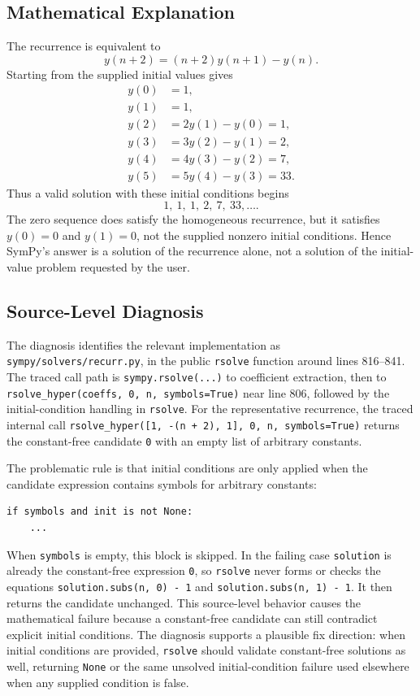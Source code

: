 \documentclass[11pt]{article}
\begin{document}
\subsection{Mathematical Explanation}

The recurrence is equivalent to
\[
    y(n+2) = (n+2)y(n+1) - y(n).
\]
Starting from the supplied initial values gives
\[
\begin{aligned}
    y(0)&=1,\\
    y(1)&=1,\\
    y(2)&=2y(1)-y(0)=1,\\
    y(3)&=3y(2)-y(1)=2,\\
    y(4)&=4y(3)-y(2)=7,\\
    y(5)&=5y(4)-y(3)=33.
\end{aligned}
\]
Thus a valid solution with these initial conditions begins
\[
    1,\ 1,\ 1,\ 2,\ 7,\ 33,\ldots .
\]
The zero sequence does satisfy the homogeneous recurrence, but it satisfies
\(y(0)=0\) and \(y(1)=0\), not the supplied nonzero initial conditions.  Hence
SymPy's answer is a solution of the recurrence alone, not a solution of the
initial-value problem requested by the user.

\subsection{Source-Level Diagnosis}

The diagnosis identifies the relevant implementation as
\nolinkurl{sympy/solvers/recurr.py}, in the public \texttt{rsolve} function
around lines 816--841.  The traced call path is
\texttt{sympy.rsolve(...)} to coefficient extraction, then to
\texttt{rsolve\_hyper(coeffs, 0, n, symbols=True)} near line 806, followed by
the initial-condition handling in \texttt{rsolve}.  For the representative
recurrence, the traced internal call
\texttt{rsolve\_hyper([1, -(n + 2), 1], 0, n, symbols=True)} returns the
constant-free candidate \texttt{0} with an empty list of arbitrary constants.

The problematic rule is that initial conditions are only applied when the
candidate expression contains symbols for arbitrary constants:

\begin{lstlisting}[style=bugpython]
if symbols and init is not None:
    ...
\end{lstlisting}

When \texttt{symbols} is empty, this block is skipped.  In the failing case
\texttt{solution} is already the constant-free expression \texttt{0}, so
\texttt{rsolve} never forms or checks the equations
\texttt{solution.subs(n, 0) - 1} and \texttt{solution.subs(n, 1) - 1}.  It then
returns the candidate unchanged.  This source-level behavior causes the
mathematical failure because a constant-free candidate can still contradict
explicit initial conditions.  The diagnosis supports a plausible fix direction:
when initial conditions are provided, \texttt{rsolve} should validate
constant-free solutions as well, returning \texttt{None} or the same unsolved
initial-condition failure used elsewhere when any supplied condition is false.
\end{document}
